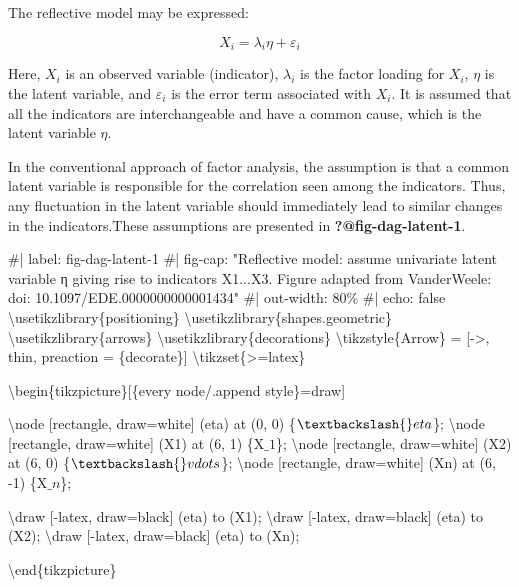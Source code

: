 \documentclass[
  letterpaper,
  DIV=11,
  numbers=noendperiod]{scrartcl}
\newenvironment{Shaded}{\begin{snugshade}}{\end{snugshade}}
\newcommand{\NormalTok}[1]{\textcolor[rgb]{0.00,0.23,0.31}{#1}}
\begin{document}
The reflective model may be expressed:

\[X_i = \lambda_i \eta + \varepsilon_i\]

Here, \(X_i\) is an observed variable (indicator), \(\lambda_i\) is the
factor loading for \(X_i\), \(\eta\) is the latent variable, and
\(\varepsilon_i\) is the error term associated with \(X_i\). It is
assumed that all the indicators are interchangeable and have a common
cause, which is the latent variable \(\eta\).

In the conventional approach of factor analysis, the assumption is that
a common latent variable is responsible for the correlation seen among
the indicators. Thus, any fluctuation in the latent variable should
immediately lead to similar changes in the indicators.These assumptions
are presented in \textbf{?@fig-dag-latent-1}.

\begin{Shaded}
\begin{Highlighting}[]
\NormalTok{\#| label: fig{-}dag{-}latent{-}1}
\NormalTok{\#| fig{-}cap: "Reflective model: assume univariate latent variable η giving rise to indicators X1...X3. Figure adapted from VanderWeele: doi: 10.1097/EDE.0000000000001434"}
\NormalTok{\#| out{-}width: 80\%}
\NormalTok{\#| echo: false}
\NormalTok{\textbackslash{}usetikzlibrary\{positioning\}}
\NormalTok{\textbackslash{}usetikzlibrary\{shapes.geometric\}}
\NormalTok{\textbackslash{}usetikzlibrary\{arrows\}}
\NormalTok{\textbackslash{}usetikzlibrary\{decorations\}}
\NormalTok{\textbackslash{}tikzstyle\{Arrow\} = [{-}\textgreater{}, thin, preaction = \{decorate\}]}
\NormalTok{\textbackslash{}tikzset\{\textgreater{}=latex\}}



\NormalTok{\textbackslash{}begin\{tikzpicture\}[\{every node/.append style\}=draw]}

\NormalTok{\textbackslash{}node [rectangle, draw=white] (eta) at (0, 0) \{$\textbackslash{}eta$\};}
\NormalTok{\textbackslash{}node [rectangle, draw=white] (X1) at (6, 1) \{X$\_1$\};}
\NormalTok{\textbackslash{}node [rectangle, draw=white] (X2) at (6, 0) \{$\textbackslash{}vdots$\};}
\NormalTok{\textbackslash{}node [rectangle, draw=white] (Xn) at (6, {-}1) \{X$\_n$\};}

\NormalTok{\textbackslash{}draw [{-}latex, draw=black] (eta) to (X1);}
\NormalTok{\textbackslash{}draw [{-}latex, draw=black] (eta) to (X2);}
\NormalTok{\textbackslash{}draw [{-}latex, draw=black] (eta) to (Xn);}

\NormalTok{\textbackslash{}end\{tikzpicture\}}
\end{Highlighting}
\end{Shaded}
\end{document}
